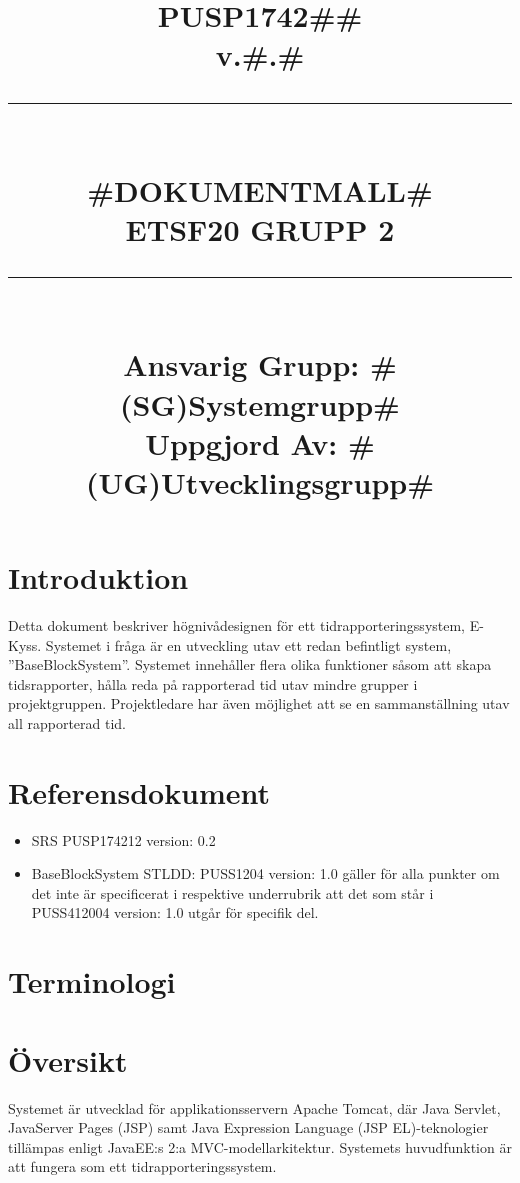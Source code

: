 \documentclass[paper=a4, fontsize=11pt,twoside]{article}
\title{
		\documentNumber{#1}																		
		\documentVersion{#2}																			
		\HRule{0.5pt} \\ %
		\LARGE \textbf{\uppercase{#3}} \\
		\large \textbf{\uppercase{ETSF20 Grupp 2}} 
		\HRule{2pt} \\ [1.5cm]    
		\normalsize            
		\documentResponsible{#4} \\ 
		\documentCreator{#5}  
	}
\newcommand{\HRule}[1]{\rule{\linewidth}{#1}}
\newcommand{\documentNumber}[1]{\centering PUSP1742#1 \\[1.0cm]}
\newcommand{\documentVersion}[1]{\centering \small{v.#1} \\[1.0cm]}
\newcommand{\documentResponsible}[1]{\centering  Ansvarig Grupp: #1}
\newcommand{\documentCreator}[1]{\centering Uppgjord Av: #1}
\newcommand{\grouptitlepage}[5]{ 
	\title{
		\documentNumber{#1}																		
		\documentVersion{#2}																			
		\HRule{0.5pt} \\ %
		\LARGE \textbf{\uppercase{#3}} \\
		\large \textbf{\uppercase{ETSF20 Grupp 2}} 
		\HRule{2pt} \\ [1.5cm]    
		\normalsize            
		\documentResponsible{#4} \\ 
		\documentCreator{#5}  
	}																							
	\maketitle																					
	\thispagestyle{empty} 																		
	\newpage 
}
\begin{document}
\grouptitlepage
{\#\#}
{\#.\#}
{\#Dokumentmall\#}
{\#(SG)Systemgrupp\#}
{\#(UG)Utvecklingsgrupp\#}
\tableofcontents

\section{Introduktion}
Detta dokument beskriver högnivådesignen för ett tidrapporteringssystem, E-Kyss. Systemet i fråga är en utveckling utav ett redan befintligt system, ''BaseBlockSystem''. Systemet innehåller flera olika funktioner såsom att skapa tidsrapporter, hålla reda på rapporterad tid utav mindre grupper i projektgruppen. Projektledare har även möjlighet att se en sammanställning utav all rapporterad tid. 

\section{Referensdokument}
\begin{itemize}
\item SRS PUSP174212 version: 0.2
\item BaseBlockSystem STLDD: PUSS1204 version: 1.0 gäller för alla punkter om det inte är specificerat i respektive underrubrik att det som står i PUSS412004 version: 1.0 utgår för specifik del.
\end{itemize}
\section{Terminologi}

\newpage
\section{Översikt}
Systemet är utvecklad för applikationsservern Apache Tomcat, där Java Servlet, JavaServer Pages (JSP) samt Java Expression Language (JSP EL)-teknologier tillämpas enligt JavaEE:s 2:a MVC-modellarkitektur. Systemets huvudfunktion är att fungera som ett tidrapporteringssystem.
\end{document}
